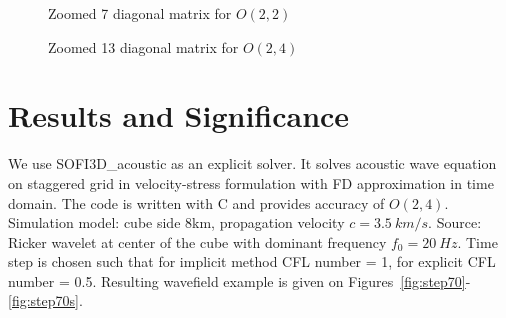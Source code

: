 \documentclass[12pt,a4paper]{report}
\begin{document}
\begin{figure}[h!]
\begin{minipage}[h!]{0.49\textwidth}
  	\caption{Zoomed 7 diagonal matrix for $O(2,2)$}
  	\label{fig:m22}
\end{minipage}
\hfill
\begin{minipage}[h!]{0.49\textwidth}
  	\caption{Zoomed 13 diagonal matrix for $O(2,4)$}
  	\label{fig:m24}
\end{minipage}
\end{figure}

\section*{Results and Significance}

We use SOFI3D\_acoustic as an explicit solver. It solves acoustic wave equation on staggered grid in velocity-stress formulation with FD approximation in time domain. The code is written with C and provides accuracy of $O(2,4)$. Simulation model: cube side 8km, propagation velocity $c=3.5\ km/s$. Source: Ricker wavelet at center of the cube with dominant frequency $f_0=20\ Hz$. Time step is chosen such that for implicit method CFL number = 1, for explicit CFL number = 0.5. Resulting wavefield example is given on Figures~\ref{fig:step70}-\ref{fig:step70s}.
\end{document}
